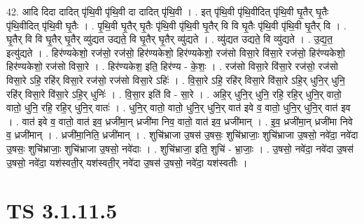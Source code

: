 \documentclass[17pt]{extarticle}
\begin{document}
42. आदि दिदा दादित् पृ॑थि॒वी पृ॑थि॒वी दा दादित् पृ॑थि॒वी । . इत् पृ॑थि॒वी पृ॑थि॒वीदित् पृ॑थि॒वी घृ॒तैर् घृ॒तैः पृ॑थि॒वीदित् पृ॑थि॒वी घृ॒तैः । . पृ॒थि॒वी घृ॒तैर् घृ॒तैः पृ॑थि॒वी पृ॑थि॒वी घृ॒तैर् वि वि घृ॒तैः पृ॑थि॒वी पृ॑थि॒वी घृ॒तैर् वि । . घृ॒तैर् वि वि घृ॒तैर् घृ॒तैर् व्यु॑द्यत उद्यते॒ वि घृ॒तैर् घृ॒तैर् व्यु॑द्यते । . व्यु॑द्यत उद्यते॒ वि व्यु॑द्यते । . उ॒द्य॒त॒ इत्यु॑द्यते । . हिर॑ण्यकेशो॒ रज॑सो॒ रज॑सो॒ हिर॑ण्यकेशो॒ हिर॑ण्यकेशो॒ रज॑सो विसा॒रे वि॑सा॒रे रज॑सो॒ हिर॑ण्यकेशो॒ हिर॑ण्यकेशो॒ रज॑सो विसा॒रे । . हिर॑ण्यकेश॒ इति॒ हिर॑ण्य - के॒शः॒ । . रज॑सो विसा॒रे वि॑सा॒रे रज॑सो॒ रज॑सो विसा॒रे ऽहि॒ रहि॑र् विसा॒रे रज॑सो॒ रज॑सो विसा॒रे ऽहिः॑ । . वि॒सा॒रे ऽहि॒ रहि॑र् विसा॒रे वि॑सा॒रे ऽहि॒र् धुनि॒र् धुनि॒ रहि॑र् विसा॒रे वि॑सा॒रे ऽहि॒र् धुनिः॑ । . वि॒सा॒र इति॑ वि - सा॒रे । . अहि॒र् धुनि॒र् धुनि॒ रहि॒ रहि॒र् धुनि॒र् वातो॒ वातो॒ धुनि॒ रहि॒ रहि॒र् धुनि॒र् वातः॑ । . धुनि॒र् वातो॒ वातो॒ धुनि॒र् धुनि॒र् वात॑ इवे व॒ वातो॒ धुनि॒र् धुनि॒र् वात॑ इव । . वात॑ इवे व॒ वातो॒ वात॑ इव॒ ध्रजी॑मा॒न् ध्रजी॑मा निव॒ वातो॒ वात॑ इव॒ ध्रजी॑मान् । . इ॒व॒ ध्रजी॑मा॒न् ध्रजी॑मा निवे व॒ ध्रजी॑मान् । . ध्रजी॑मा॒निति॒ ध्रजी॑मान् । . शुचि॑भ्राजा उ॒षस॑ उ॒षसः॒ शुचि॑भ्राजाः॒ शुचि॑भ्राजा उ॒षसो॒ नवे॑दा॒ नवे॑दा उ॒षसः॒ शुचि॑भ्राजाः॒ शुचि॑भ्राजा उ॒षसो॒ नवे॑दाः । . शुचि॑भ्राजा॒ इति॒ शुचि॑ - भ्रा॒जाः॒ । . उ॒षसो॒ नवे॑दा॒ नवे॑दा उ॒षस॑ उ॒षसो॒ नवे॑दा॒ यश॑स्वती॒र् यश॑स्वती॒र् नवे॑दा उ॒षस॑ उ॒षसो॒ नवे॑दा॒ यश॑स्वतीः । \newline
\pagebreak
{}

\section{ TS 3.1.11.5 }
\end{document}
